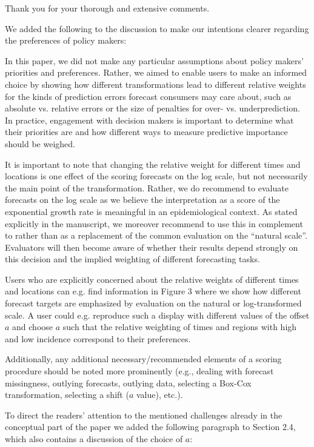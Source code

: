 \documentclass{article}
\newcommand{\black}{\color{black}}
\newcommand{\blue}{\color{blue}}
\newcommand{\indented}{\setlength{\leftskip}{1cm}}
\newcommand{\notindented}{\setlength{\leftskip}{0cm}}
\begin{document}
\black

Thank you for your thorough and extensive comments. 
 
We added the following to the discussion to make our intentions clearer regarding the preferences of policy makers: 

\indented
In this paper, we did not make any particular assumptions about policy makers' priorities and preferences. Rather, we aimed to enable users to make an informed choice by showing how different transformations lead to different relative weights for the kinds of prediction errors forecast consumers may care about, such as absolute vs. relative errors or the size of penalties for over- vs. underprediction. In practice, engagement with decision makers is important to determine what their priorities are and how different ways to measure predictive importance should be weighed.

\notindented
It is important to note that changing the relative weight for different times and locations is one effect of the scoring forecasts on the log scale, but not necessarily the main point of the transformation. Rather, we do recommend to evaluate forecasts on the log scale as we believe the interpretation as a score of the exponential growth rate is meaningful in an epidemiological context. As stated explicitly in the manuscript, we moreover recommend to use this in complement to rather than as a replacement of the common evaluation on the ``natural scale''. Evaluators will then become aware of whether their results depend strongly on this decision and the implied weighting of different forecasting tasks.

Users who are explicitly concerned about the relative weights of different times and locations can e.g. find information in Figure 3 where we show how different forecast targets are emphasized by evaluation on the natural or log-transformed scale. A user could e.g. reproduce such a display with different values of the offset $a$ and choose $a$ such that the relative weighting of times and regions with high and low incidence correspond to their preferences. 

\blue
Additionally, any additional necessary/recommended elements of a scoring procedure should be noted more prominently (e.g., dealing with forecast missingness, outlying forecasts, outlying data, selecting a Box-Cox transformation, selecting a shift ($a$ value), etc.).

\black

To direct the readers' attention to the mentioned challenges already in the conceptual part of the paper we added the following paragraph to Section 2.4, which also contains a discussion of the choice of $a$:
\end{document}
